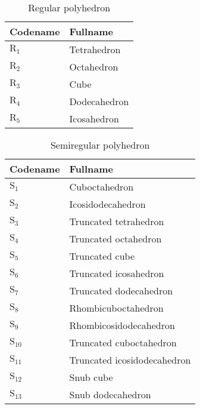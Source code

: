 
\topmargin -10mm
\topskip 0mm
\oddsidemargin 0mm
\evensidemargin 0pt
\setlength{\textwidth}{16cm}
\setlength{\textheight}{23.5cm}

\newcommand{\bm}[1]{\mbox{\boldmath $#1$}}

\newcommand{\fsym}[1]{{\it #1}}

\newcommand{\rsym}[1]{\mbox{\bf #1}}

\newcommand{\phr}[1]{\mbox{R$_{#1}$}}
\newcommand{\phs}[1]{\mbox{S$_{#1}$}}
\newcommand{\php}[1]{\mbox{$\Pi_{#1}$}}
\newcommand{\pha}[1]{\mbox{A$_{#1}$}}
\newcommand{\phm}[1]{\mbox{M$_{#1}$}}
\newcommand{\phn}[1]{\mbox{N$_{#1}$}}

\newcommand{\longvec}[1]{\vbox{\hbox{$\longrightarrow$}\vspace{-0.8zh}\hbox{#1}}}



\begin{table}[htbp]
\caption{Regular polyhedron}
\begin{center}
\begin{tabular}{l|l} \hline
Codename & Fullname \\ \hline
$\phr{1}$ & Tetrahedron \\
$\phr{2}$ & Octahedron \\
$\phr{3}$ & Cube \\
$\phr{4}$ & Dodecahedron \\
$\phr{5}$ & Icosahedron \\ \hline
\end{tabular}
\end{center}
\end{table}

\begin{table}[htbp]
\caption{Semiregular polyhedron}
\begin{center}
\begin{tabular}{l|l} \hline
Codename & Fullname \\ \hline
$\phs{1}$ & Cuboctahedron \\
$\phs{2}$ & Icosidodeca\-hedron \\
$\phs{3}$ & Truncated tetrahedron \\
$\phs{4}$ & Truncated octahedron \\
$\phs{5}$ & Truncated cube \\
$\phs{6}$ & Truncated icosahedron \\
$\phs{7}$ & Truncated dodecahedron \\
$\phs{8}$ & Rhombicuboctahedron \\
$\phs{9}$ & Rhombicosidodecahedron \\
$\phs{10}$ & Truncated cuboctahedron \\
$\phs{11}$ & Truncated icosidodeca\-hedron \\
$\phs{12}$ & Snub cube \\
$\phs{13}$ & Snub dodeca\-hedron \\ \hline
\end{tabular}
\end{center}
\end{table}

